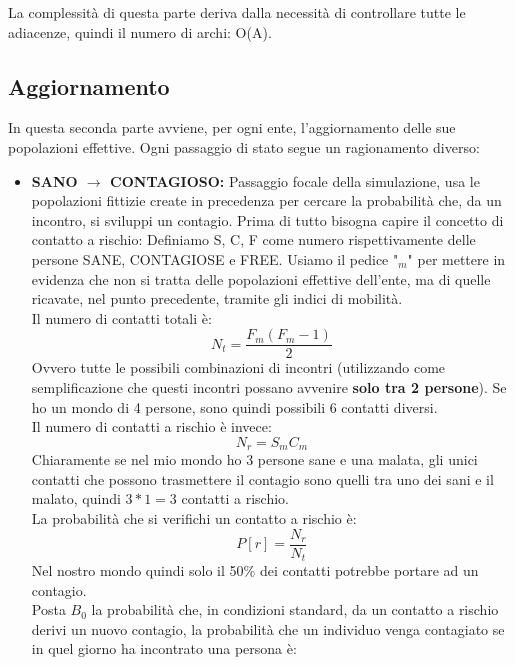 \documentclass[a4paper, 12pt]{article}
\begin{document}
		
		La complessità di questa parte deriva dalla necessità di controllare tutte le adiacenze, quindi il numero di archi: O(A).
		
	\subsection{Aggiornamento}
		In questa seconda parte avviene, per ogni ente, l'aggiornamento delle sue popolazioni effettive.
		Ogni passaggio di stato segue un ragionamento diverso:
		\begin{itemize}
			\item \textbf{SANO $\to$ CONTAGIOSO:} Passaggio focale della simulazione, usa le popolazioni fittizie create in precedenza per cercare la probabilità che, da un incontro, si sviluppi un contagio.
			Prima di tutto bisogna capire il concetto di contatto a rischio:
			Definiamo S, C, F come numero rispettivamente delle persone SANE, CONTAGIOSE e FREE.
			Usiamo il pedice "$_{m}$" per mettere in evidenza che non si tratta delle popolazioni effettive dell'ente, ma di quelle ricavate, nel punto precedente, tramite gli indici di mobilità.\\
			Il numero di contatti totali è:
			\begin{equation}
				N_{t} = \dfrac{F_{m} (F_{m}-1)}{2}
			\end{equation}
			Ovvero tutte le possibili combinazioni di incontri (utilizzando come semplificazione che questi incontri possano avvenire \textbf{solo tra 2 persone}).
			Se ho un mondo di 4 persone, sono quindi possibili 6 contatti diversi.\\
			Il numero di contatti a rischio è invece:
			\begin{equation}
				N_{r} = S_{m} C_{m}
			\end{equation}
			Chiaramente se nel mio mondo ho 3 persone sane e una malata, gli unici contatti che possono trasmettere il contagio sono quelli tra uno dei sani e il malato, quindi $3*1 = 3$ contatti a rischio.\\
			La probabilità che si verifichi un contatto a rischio è:
			\begin{equation}
				P[r] = \dfrac{N_{r}}{N_{t}}
			\end{equation}
			Nel nostro mondo quindi solo il 50\% dei contatti potrebbe portare ad un contagio.\\
			Posta $B_{0}$ la probabilità che, in condizioni standard, da un contatto a rischio derivi un nuovo contagio, la probabilità che un individuo venga contagiato se in quel giorno ha incontrato una persona è:

\end{itemize}
\end{document}
